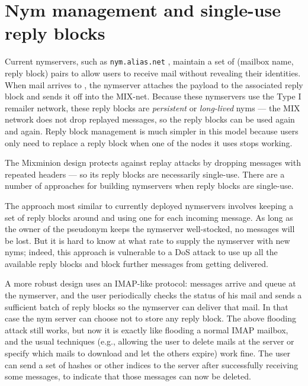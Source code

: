 \documentclass{llncs}
\newcommand\emailaddr{\begingroup \def\UrlLeft{<}\def\UrlRight{>}\urlstyle{tt}\Url}
\begin{document}


\section{Nym management and single-use reply blocks}
\label{sec:nymservers}

Current nymservers, such as {\tt nym.alias.net} \cite{nym-alias-net},
maintain a set of (mailbox name, reply block) pairs to allow users to
receive mail without revealing their identities. When mail arrives to
\emailaddr{bob@nym.alias.net}, the nymserver attaches the payload to
the associated
reply block and sends it off into the MIX-net. Because these nymservers
use the Type I remailer network, these reply blocks are \emph{persistent}
or \emph{long-lived} nyms --- the MIX network does not drop replayed
messages, so the reply blocks can be used again and again. Reply block
management is much simpler in this model because users only need to
replace a reply block when one of the nodes it uses stops working.

The Mixminion design protects against replay attacks by dropping
messages with repeated headers --- so its reply blocks are necessarily
single-use. There are a number of approaches for building nymservers
when reply blocks are single-use.

The approach most similar to currently deployed nymservers involves
keeping a set of reply blocks around and using one for each incoming
message. As long as the owner of the pseudonym keeps the nymserver
well-stocked, no messages will be lost. But it is hard to know at what
rate to supply the nymserver with new nyms; indeed, this approach is
vulnerable to a DoS attack to use up all the available reply blocks and
block further messages from getting delivered.

A more robust design uses an IMAP-like protocol: messages arrive and queue
at the nymserver, and the user periodically checks the status of his mail
and sends a sufficient batch of reply blocks so the nymserver can deliver
that mail. In that case the nym server can choose not to store any reply block.
The above flooding attack still works, but now it is exactly
like flooding a normal IMAP mailbox, and the usual techniques (e.g.,
allowing the user to delete mails at the server or specify which mails to
download and let the others expire) work fine. The user can send a set
of hashes or other indices to the server after successfully receiving
some messages, to indicate that those messages can now be deleted.
\end{document}
